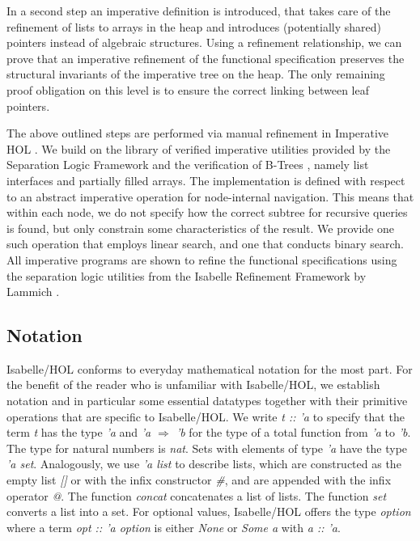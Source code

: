 \documentclass[a4paper,UKenglish,cleveref, cref, thm-restate]{lipics-v2021}
\begin{document}
In a second step an imperative definition is introduced,
that takes care of the refinement of lists to arrays in the heap
and introduces (potentially shared) pointers instead of algebraic structures.
Using a refinement relationship, we can prove that an imperative refinement
of the functional specification preserves the structural invariants
of the imperative tree on the heap.
The only remaining proof obligation on this level is to ensure the correct linking
between leaf pointers.

The above outlined steps are performed via manual refinement in Imperative HOL \cite{DBLP:conf/tphol/BulwahnKHEM08}.
We build on the library of verified imperative utilities
provided by the Separation Logic Framework \cite{DBLP:journals/afp/LammichM12}
and the verification of B-Trees \cite{DBLP:journals/afp/Mundler21},
namely list interfaces and partially filled arrays.
The implementation is defined with respect to an abstract imperative
operation for node-internal navigation.
This means that within each node, we do not specify
how the correct subtree for recursive queries is found,
but only constrain some characteristics of the result.
We provide one such operation that employs linear search,
and one that conducts binary search.
All imperative programs are shown to refine the functional specifications
using the separation logic utilities from the Isabelle Refinement Framework by
Lammich \cite{DBLP:journals/jar/Lammich19}.

\subsection{Notation}

Isabelle/HOL conforms to everyday mathematical notation for the most part.
For the benefit of the reader who is unfamiliar with Isabelle/HOL, we establish
notation and in particular some essential datatypes together with their primitive
operations that are specific to Isabelle/HOL. We write \textit{t :: 'a} to specify that
the term \textit{t} has the type \textit{'a} and \textit{'a $\Rightarrow$ 'b}
for the type of a total function from \textit{'a} to \textit{'b}.
The type for natural numbers is \textit{nat}.
Sets with elements of type \textit{'a} have the type \textit{'a set}.
Analogously, we use \textit{'a list} to describe lists, which are constructed as the empty
list \textit{[]} or with the infix constructor \textit{\#}, and are appended with the infix operator
\textit{@}. The function \textit{concat} concatenates a list of lists.
The function \textit{set} converts a list into a set. For optional values, Isabelle/HOL
offers the type \textit{option} where a term \textit{opt :: 'a option} is either \textit{None} or \textit{Some a}
with \textit{a :: 'a}.
\end{document}
